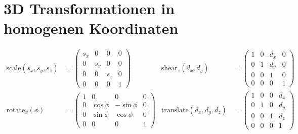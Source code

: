 \section{3D Transformationen in homogenen Koordinaten}
\begin{align*}
  \mathrm{scale}(s_x, s_y, s_z) &=
  \begin{pmatrix}
    s_x & 0   & 0   & 0 \\
    0   & s_y & 0   & 0 \\
    0   & 0   & s_z & 0 \\
    0   & 0   & 0   & 1
  \end{pmatrix}\
  &
  \mathrm{shear}_{z}(d_x, d_y) &=
  \begin{pmatrix}
    1 & 0 & d_x & 0 \\
    0 & 1 & d_y & 0 \\
    0 & 0 & 1   & 0 \\
    0 & 0 & 0   & 1
  \end{pmatrix} \\
  \mathrm{rotate}_x(\phi) &=
  \begin{pmatrix}
    1 & 0         & 0          & 0 \\
    0 & \cos \phi & -\sin \phi & 0 \\
    0 & \sin \phi & \cos \phi  & 0 \\
    0 & 0         & 0          & 1
  \end{pmatrix}
  &
  \mathrm{translate}(d_x, d_y, d_z) &=
  \begin{pmatrix}
    1 & 0 & 0 & d_x \\
    0 & 1 & 0 & d_y \\
    0 & 0 & 1 & d_z \\
    0 & 0 & 0 & 1
  \end{pmatrix}
\end{align*}

